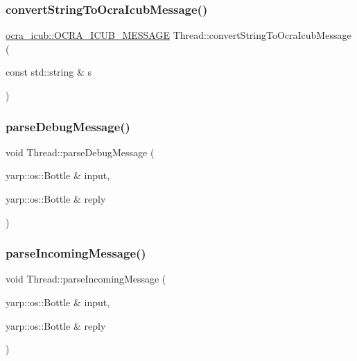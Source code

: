 \subsubsection{\texorpdfstring{convert\+String\+To\+Ocra\+Icub\+Message()}{convertStringToOcraIcubMessage()}}
{\footnotesize\ttfamily \hyperlink{namespaceocra__icub_afbd2db66b68005fb7cfac19210caf83f}{ocra\+\_\+icub\+::\+O\+C\+R\+A\+\_\+\+I\+C\+U\+B\+\_\+\+M\+E\+S\+S\+A\+GE} Thread\+::convert\+String\+To\+Ocra\+Icub\+Message (\begin{DoxyParamCaption}\item[{const std\+::string \&}]{s }\end{DoxyParamCaption})\hspace{0.3cm}{\ttfamily [private]}}

\hypertarget{classThread_a6ce5ef9684cb2793be85e7402ad672f0}{}\label{classThread_a6ce5ef9684cb2793be85e7402ad672f0} 
\subsubsection{\texorpdfstring{parse\+Debug\+Message()}{parseDebugMessage()}}
{\footnotesize\ttfamily void Thread\+::parse\+Debug\+Message (\begin{DoxyParamCaption}\item[{yarp\+::os\+::\+Bottle \&}]{input,  }\item[{yarp\+::os\+::\+Bottle \&}]{reply }\end{DoxyParamCaption})\hspace{0.3cm}{\ttfamily [private]}}

\hypertarget{classThread_ae21029d250ac7c720f2411eab71a9414}{}\label{classThread_ae21029d250ac7c720f2411eab71a9414} 
\subsubsection{\texorpdfstring{parse\+Incoming\+Message()}{parseIncomingMessage()}}
{\footnotesize\ttfamily void Thread\+::parse\+Incoming\+Message (\begin{DoxyParamCaption}\item[{yarp\+::os\+::\+Bottle \&}]{input,  }\item[{yarp\+::os\+::\+Bottle \&}]{reply }\end{DoxyParamCaption})\hspace{0.3cm}{\ttfamily [private]}}

